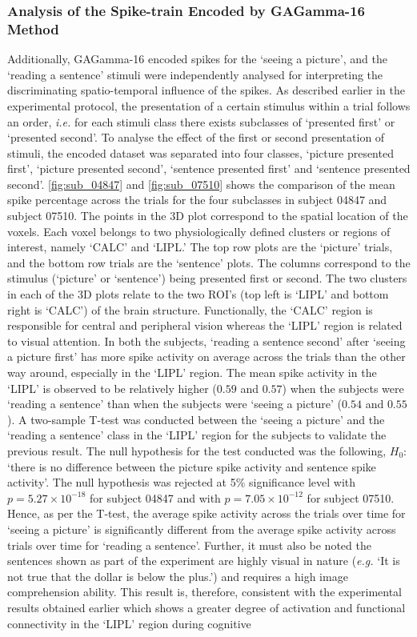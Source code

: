 \subsubsection{Analysis of the Spike-train Encoded by GAGamma-16 Method}
Additionally, GAGamma-16 encoded spikes for the `seeing a picture', and the `reading a sentence' stimuli were independently analysed for interpreting the discriminating spatio-temporal influence of the spikes. As described earlier in the experimental protocol, the presentation of a certain stimulus within a trial follows an order, \emph{i.e.} for each stimuli class there exists subclasses of `presented first' or `presented second'. To analyse the effect of the first or second presentation of stimuli, the encoded dataset was separated into four classes, `picture presented first', `picture presented second', `sentence presented first' and `sentence presented second'. \figurenames \ref{fig:sub_04847} and \ref{fig:sub_07510} shows the comparison of the mean spike percentage across the trials for the four subclasses in subject 04847 and subject 07510. The points in the 3D plot correspond to the spatial location of the voxels. Each voxel belongs to two physiologically defined clusters or regions of interest, namely `CALC' and `LIPL.' The top row plots are the `picture' trials, and the bottom row trials are the `sentence' plots. The columns correspond to the stimulus (`picture' or `sentence') being presented first or second. The two clusters in each of the 3D plots relate to the two ROI's (top left is `LIPL' and bottom right is `CALC') of the brain structure. Functionally, the `CALC' region is responsible for central and peripheral vision whereas the `LIPL' region is related to visual attention. In both the subjects, `reading a sentence second' after `seeing a picture first' has more spike activity on average across the trials than the other way around, especially in the `LIPL' region. The mean spike activity in the `LIPL' is observed to be relatively higher ($0.59$ and $0.57$) when the subjects were `reading a sentence' than when the subjects were `seeing a picture' ($0.54$ and $0.55$). A two-sample T-test was conducted between the `seeing a picture' and the `reading a sentence' class in the `LIPL' region for the subjects to validate the previous result. The null hypothesis for the test conducted was the following, $H_0$: `there is no difference between the picture spike activity and sentence spike activity'. The null hypothesis was rejected at 5\% significance level with $p=5.27\times 10^{-18}$ for subject 04847 and with $p=7.05\times 10^{-12}$ for subject 07510. Hence, as per the T-test, the average spike activity across the trials over time for `seeing a picture' is significantly different from the average spike activity across trials over time for `reading a sentence'. Further, it must also be noted the sentences shown as part of the experiment are highly visual in nature (\emph{e.g.} `It is not true that the dollar is below the plus.') and requires a high image comprehension ability. This result is, therefore, consistent with the experimental results \citep{just2004imagery} obtained earlier which shows a greater degree of activation and functional connectivity in the `LIPL' region during cognitive 